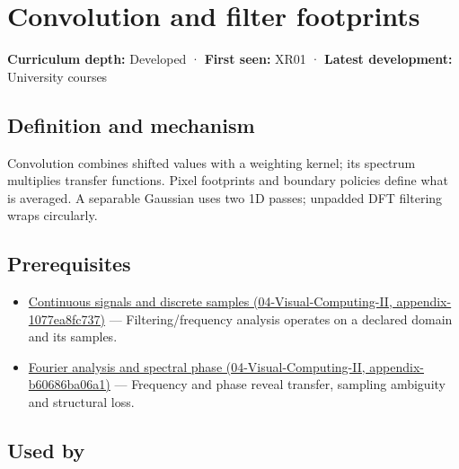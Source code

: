 \hypertarget{appendix-d5b3c692d9f0}{}
\section{Convolution and filter footprints}\label{appendix-d5b3c692d9f0-convolution-and-filter-footprints}

\textbf{Curriculum depth:} Developed · \textbf{First seen:} XR01 · \textbf{Latest development:} University courses

\subsection{Definition and mechanism}\label{appendix-d5b3c692d9f0-definition-and-mechanism}

Convolution combines shifted values with a weighting kernel; its spectrum multiplies transfer functions. Pixel footprints and boundary policies define what is averaged. A separable Gaussian uses two 1D passes; unpadded DFT filtering wraps circularly.

\subsection{Prerequisites}\label{appendix-d5b3c692d9f0-prerequisites}

\begin{itemize}
\tightlist
\item
  \href{../04-Visual-Computing-II/main.pdf\#nameddest=appendix-1077ea8fc737}{Continuous signals and discrete samples (04-Visual-Computing-II, appendix-1077ea8fc737)} --- Filtering/frequency analysis operates on a declared domain and its samples.
\item
  \href{../04-Visual-Computing-II/main.pdf\#nameddest=appendix-b60686ba06a1}{Fourier analysis and spectral phase (04-Visual-Computing-II, appendix-b60686ba06a1)} --- Frequency and phase reveal transfer, sampling ambiguity and structural loss.
\end{itemize}

\subsection{Used by}\label{appendix-d5b3c692d9f0-used-by}

